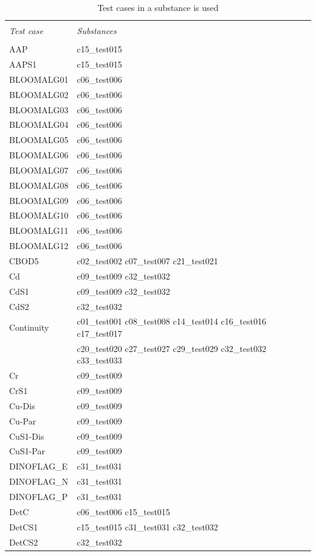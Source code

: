 
\begin{longtable}{ll}
\caption{Test cases in a substance is used} \\
\hline \\
\emph{Test case} & \emph{Substances} \\
\hline \\
AAP & c15\_test015 \\
AAPS1 & c15\_test015 \\
BLOOMALG01 & c06\_test006 \\
BLOOMALG02 & c06\_test006 \\
BLOOMALG03 & c06\_test006 \\
BLOOMALG04 & c06\_test006 \\
BLOOMALG05 & c06\_test006 \\
BLOOMALG06 & c06\_test006 \\
BLOOMALG07 & c06\_test006 \\
BLOOMALG08 & c06\_test006 \\
BLOOMALG09 & c06\_test006 \\
BLOOMALG10 & c06\_test006 \\
BLOOMALG11 & c06\_test006 \\
BLOOMALG12 & c06\_test006 \\
CBOD5 & c02\_test002 c07\_test007 c21\_test021 \\
Cd & c09\_test009 c32\_test032 \\
CdS1 & c09\_test009 c32\_test032 \\
CdS2 & c32\_test032 \\
Continuity & c01\_test001 c08\_test008 c14\_test014 c16\_test016 c17\_test017 \\ 
 & c20\_test020 c27\_test027 c29\_test029 c32\_test032 c33\_test033 \\
Cr & c09\_test009 \\
CrS1 & c09\_test009 \\
Cu-Dis & c09\_test009 \\
Cu-Par & c09\_test009 \\
CuS1-Dis & c09\_test009 \\
CuS1-Par & c09\_test009 \\
DINOFLAG\_E & c31\_test031 \\
DINOFLAG\_N & c31\_test031 \\
DINOFLAG\_P & c31\_test031 \\
DetC & c06\_test006 c15\_test015 \\
DetCS1 & c15\_test015 c31\_test031 c32\_test032 \\
DetCS2 & c32\_test032 \\

\end{longtable}
